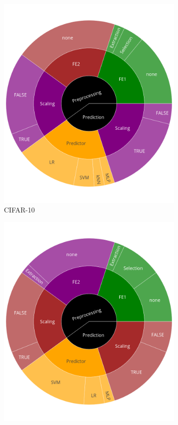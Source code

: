 \begin{figure}
    \centering
    
  	\begin{subfigure}[t]{0.3\textwidth}
    \centering\includegraphics[width=\textwidth]{img/sunburst/cifar10.png}
    \caption{CIFAR-10}
  	\end{subfigure}
  	\begin{subfigure}[t]{0.3\textwidth}
    \centering\includegraphics[width=\textwidth]{img/sunburst/fmnist.png}

\end{subfigure}
\end{figure}
